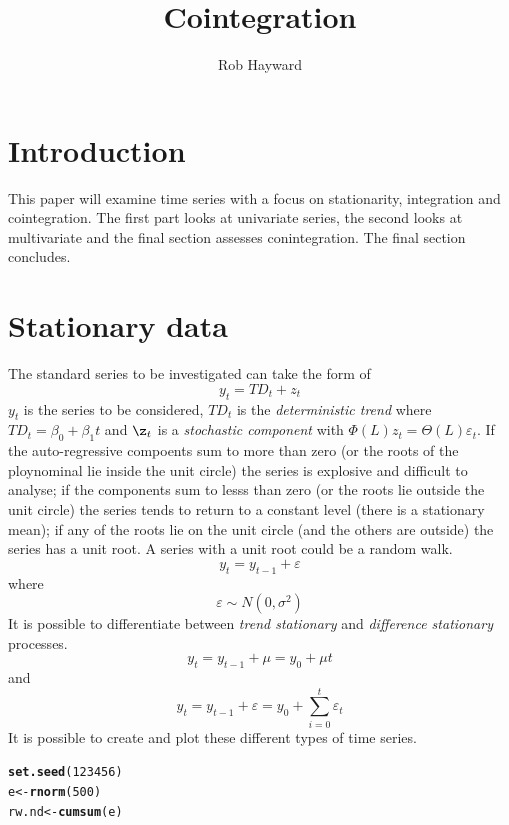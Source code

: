 \documentclass{article}\usepackage{graphicx, color}
\title{Cointegration}
\author{Rob Hayward}
\makeatletter
\newcommand{\hlfunctioncall}[1]{\textcolor[rgb]{0.501960784313725,0,0.329411764705882}{\textbf{#1}}}%
\newenvironment{kframe}{%
 \def\at@end@of@kframe{}%
 \ifinner\ifhmode%
  \def\at@end@of@kframe{\end{minipage}}%
  \begin{minipage}{\columnwidth}%
 \fi\fi%
 \def\FrameCommand##1{\hskip\@totalleftmargin \hskip-\fboxsep
 \colorbox{shadecolor}{##1}\hskip-\fboxsep
     \hskip-\linewidth \hskip-\@totalleftmargin \hskip\columnwidth}%
 \MakeFramed {\advance\hsize-\width
   \@totalleftmargin\z@ \linewidth\hsize
   \@setminipage}}%
 {\par\unskip\endMakeFramed%
 \at@end@of@kframe}
\newenvironment{knitrout}{}{} %
\makeatother
\begin{document}
\maketitle
\section{Introduction}
This paper will examine time series with a focus on stationarity, integration and cointegration. The first part looks at univariate series, the second looks at multivariate and the final section assesses conintegration.  The final section concludes.  

\section{Stationary data}
The standard series to be investigated can take the form of 
\begin{equation}
y_t = TD_t + z_t
\end{equation}
$y_t$ is the series to be considered, $TD_t$ is the \emph{deterministic trend} where $TD_t = \beta_0 +\beta_1 t$ and $\z_t$ is a \emph{stochastic component} with $\Phi(L)z_t = \Theta(L)\varepsilon_t$.  
If the auto-regressive compoents sum to more than zero (or the roots of the ploynominal lie inside the unit circle) the series is explosive and difficult to analyse; if the components sum to lesss than zero (or the roots lie outside the unit circle) the series tends to return to a constant level (there is a stationary mean); if any of the roots lie on the unit circle (and the others are outside) the series has a unit root. A series with a unit root could be a random walk. 
\begin{equation}
y_t = y_{t-1} + \varepsilon
\end{equation}
where 
\begin{equation*}
\varepsilon \sim N(0, \sigma^2)
\end{equation*}
It is possible to differentiate between \emph{trend stationary} and \emph{difference stationary} processes. 
\begin{equation}
y_t = y_{t-1} + \mu = y_0 + \mu t
\end{equation}
and
\begin{equation}
y_t = y_{t-1} + \varepsilon = y_0 + \sum_{i=0}^t \varepsilon_t
\end{equation}
It is possible to create and plot these different types of time series. 
\begin{knitrout}
\color{fgcolor}\begin{kframe}
\begin{alltt}
\hlfunctioncall{set.seed}(123456)
e <- \hlfunctioncall{rnorm}(500)
rw.nd <- \hlfunctioncall{cumsum}(e)
\end{alltt}
\end{kframe}
\end{knitrout}
\end{document}
